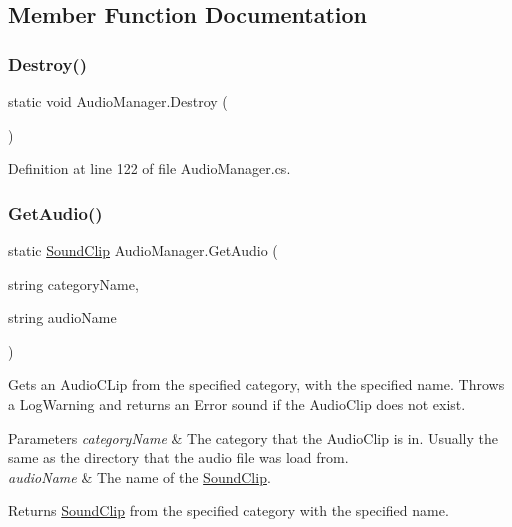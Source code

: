 \subsection{Member Function Documentation}
\mbox{\label{class_audio_manager_ae00b97e57d52aa4b569004c48e5cd9ab}} 
\subsubsection{\texorpdfstring{Destroy()}{Destroy()}}
{\footnotesize\ttfamily static void Audio\+Manager.\+Destroy (\begin{DoxyParamCaption}{ }\end{DoxyParamCaption})\hspace{0.3cm}{\ttfamily [static]}}



Definition at line 122 of file Audio\+Manager.\+cs.

\mbox{\label{class_audio_manager_a58e26f36e8bf3c4f06312bcc9ec75f13}} 
\subsubsection{\texorpdfstring{Get\+Audio()}{GetAudio()}}
{\footnotesize\ttfamily static \hyperlink{class_sound_clip}{Sound\+Clip} Audio\+Manager.\+Get\+Audio (\begin{DoxyParamCaption}\item[{string}]{category\+Name,  }\item[{string}]{audio\+Name }\end{DoxyParamCaption})\hspace{0.3cm}{\ttfamily [static]}}



Gets an Audio\+C\+Lip from the specified category, with the specified name. Throws a Log\+Warning and returns an Error sound if the Audio\+Clip does not exist. 


\begin{DoxyParams}{Parameters}
{\em category\+Name} & The category that the Audio\+Clip is in. Usually the same as the directory that the audio file was load from. \\
\hline
{\em audio\+Name} & The name of the \hyperlink{class_sound_clip}{Sound\+Clip}.\\
\hline
\end{DoxyParams}
\begin{DoxyReturn}{Returns}
\hyperlink{class_sound_clip}{Sound\+Clip} from the specified category with the specified name.
\end{DoxyReturn}


